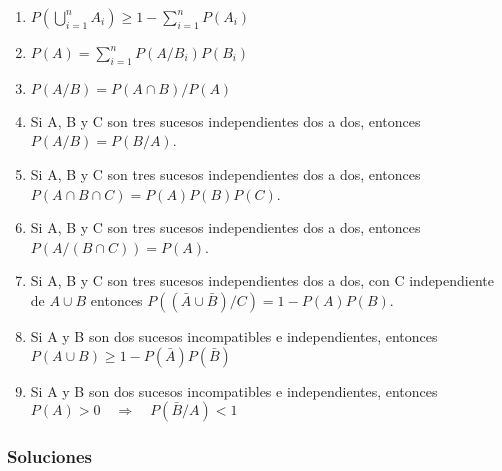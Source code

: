 \documentclass[fleqn]{article}
\def\next{\quad \Rightarrow \quad}
\begin{document}
\begin{enumerate}
\begin{enumerate}
                                \item $P(\bigcup_{i=1}^n A_i) \geq 1 - \sum_{i=1} ^n P(A_i)$
                                \item $P(A) = \sum_{i=1}^n P(A/B_i)P(B_i)$
                                \item $P(A/B) = P(A\cap B) / P(A)$
                                \item Si A, B y C son tres sucesos independientes dos a dos, entonces \\ $P(A/B) = P(B/A)$.
                                \item Si A, B y C son tres sucesos independientes dos a dos, entonces \\ $P(A\cap B \cap C) = P(A)P(B)P(C)$.
                                \item Si A, B y C son tres sucesos independientes dos a dos, entonces \\ $P(A/(B\cap C)) = P(A)$.
                                \item Si A, B y C son tres sucesos independientes dos a dos, con C independiente de $A\cup B$ entonces
                                        $P((\bar{A}\cup \bar{B})/C) = 1 - P(A)P(B)$.
                                \item Si A y B son dos sucesos incompatibles e independientes, entonces \\ $P(A \cup B) \geq 1 - P(\bar{A}) P(\bar{B})$
                                \item Si A y B son dos sucesos incompatibles e independientes, entonces \\ $P(A) > 0 \next P(\bar{B}/A)<1$ 
                        \end{enumerate}


                \newpage

                \subsubsection{Soluciones}


\end{enumerate}
\end{document}
